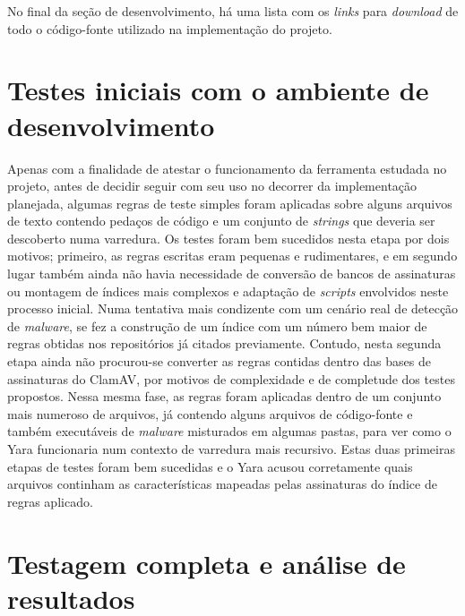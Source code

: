 No final da seção de desenvolvimento, há uma lista com os \textit{links} para
\textit{download} de todo o código-fonte utilizado na implementação do projeto.

\section{Testes iniciais com o ambiente de desenvolvimento}
\label{s.testesiniciais}

Apenas com a finalidade de atestar o funcionamento da ferramenta estudada no
projeto, antes de decidir seguir com seu uso no decorrer da implementação
planejada, algumas regras de teste simples foram aplicadas sobre alguns arquivos
de texto contendo pedaços de código e um conjunto de \textit{strings} que
deveria ser descoberto numa varredura. Os testes foram bem sucedidos nesta etapa
por dois motivos; primeiro, as regras escritas eram pequenas e rudimentares, e
em segundo lugar também ainda não havia necessidade de conversão de bancos de
assinaturas ou montagem de índices mais complexos e adaptação de
\textit{scripts} envolvidos neste processo inicial. Numa tentativa mais
condizente com um cenário real de detecção de \textit{malware}, se fez a
construção de um índice com um número bem maior de regras obtidas nos
repositórios já citados previamente. Contudo, nesta segunda etapa ainda não
procurou-se converter as regras contidas dentro das bases de assinaturas do
ClamAV, por motivos de complexidade e de completude dos testes propostos. Nessa
mesma fase, as regras foram aplicadas dentro de um conjunto mais numeroso de
arquivos, já contendo alguns arquivos de código-fonte e também executáveis de
\textit{malware} misturados em algumas pastas, para ver como o Yara funcionaria
num contexto de varredura mais recursivo. Estas duas primeiras etapas de testes
foram bem sucedidas e o Yara acusou corretamente quais arquivos continham as
características mapeadas pelas assinaturas do índice de regras aplicado.



\section{Testagem completa e análise de resultados}
\label{s.testefull}


